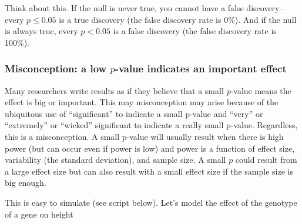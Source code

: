 \documentclass[]{book}
\newenvironment{Shaded}{\begin{snugshade}}{\end{snugshade}}
\newcommand{\KeywordTok}[1]{\textcolor[rgb]{0.13,0.29,0.53}{\textbf{#1}}}
\newcommand{\DataTypeTok}[1]{\textcolor[rgb]{0.13,0.29,0.53}{#1}}
\newcommand{\DecValTok}[1]{\textcolor[rgb]{0.00,0.00,0.81}{#1}}
\newcommand{\FloatTok}[1]{\textcolor[rgb]{0.00,0.00,0.81}{#1}}
\newcommand{\StringTok}[1]{\textcolor[rgb]{0.31,0.60,0.02}{#1}}
\newcommand{\OperatorTok}[1]{\textcolor[rgb]{0.81,0.36,0.00}{\textbf{#1}}}
\newcommand{\NormalTok}[1]{#1}
\begin{document}
Think about this. If the null is never true, you cannot have a false
discovery--every \(p \le 0.05\) is a true discovery (the false discovery
rate is 0\%). And if the null is always true, every \(p < 0.05\) is a
false discovery (the false discovery rate is 100\%).

\subsubsection{\texorpdfstring{Misconception: a low \(p\)-value
indicates an important
effect}{Misconception: a low p-value indicates an important effect}}\label{misconception-a-low-p-value-indicates-an-important-effect}

Many researchers write results as if they believe that a small
\emph{p}-value means the effect is big or important. This may
misconception may arise because of the ubiquitous use of ``significant''
to indicate a small p-value and ``very'' or ``extremely'' or ``wicked''
significant to indicate a really small p-value. Regardless, this is a
misconception. A small p-value will usually result when there is high
power (but can occur even if power is low) and power is a function of
effect size, variability (the standard deviation), and sample size. A
small \(p\) could result from a large effect size but can also result
with a small effect size if the sample size is big enough.

This is easy to simulate (see script below). Let's model the effect of
the genotype of a gene on height

\begin{Shaded}
\end{Shaded}
\end{document}
